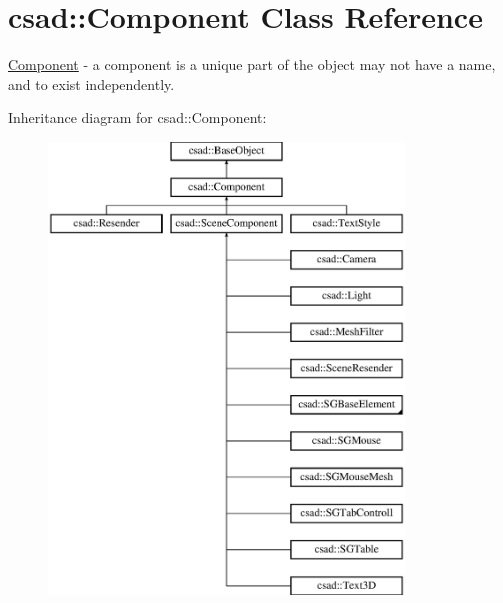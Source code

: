 \hypertarget{classcsad_1_1_component}{\section{csad\-:\-:Component Class Reference}
\label{classcsad_1_1_component}
}


\hyperlink{classcsad_1_1_component}{Component} -\/ a component is a unique part of the object may not have a name, and to exist independently.  


Inheritance diagram for csad\-:\-:Component\-:\begin{figure}[H]
\begin{center}
\leavevmode
\includegraphics[height=12.000000cm]{classcsad_1_1_component}
\end{center}
\end{figure}
